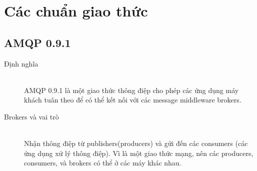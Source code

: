 \section{Các chuẩn giao thức}
\subsection{AMQP 0.9.1}

\begin{description}
\item[Định nghĩa]\hfill \\
AMQP 0.9.1 là một giao thức thông điệp cho phép các ứng dụng máy khách tuân theo để có thể kết nối với các message middleware brokers.	
		
\item [Brokers và vai trò]\hfill \\
Nhận thông điệp từ publishers(producers) và gửi đến các consumers (các ứng dụng xử lý thông điệp). Vì là một giao thức mạng, nên các producers, consumers, và brokers có thể ở các máy khác nhau.
	
\end{description}
